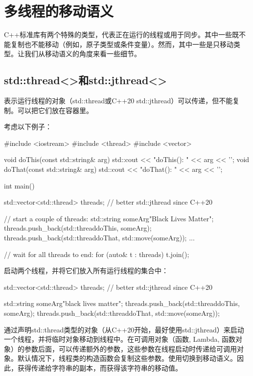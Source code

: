 \section{多线程的移动语义}
C++标准库有两个特殊的类型，代表正在运行的线程或用于同步。其中一些既不能复制也不能移动（例如，原子类型或条件变量）。然而，其中一些是只移动类型。让我们从移动语义的角度来看一些细节。

\subsection{std::thread<>和std::jthread<>}

表示运行线程的对象（std::thread或C++20 std::jthread）可以传递，但不能复制。可以把它们放在容器里。

考虑以下例子：

\begin{cppcode}
#include <iostream>
#include <thread>
#include <vector>

void doThis(const std::string& arg) {
	std::cout << "doThis(): " << arg << '\n';
}
void doThat(const std::string& arg) {
	std::cout << "doThat(): " << arg << '\n';
}

int main()
{
	std::vector<std::thread> threads; // better std::jthread since C++20

	// start a couple of threads:
	std::string someArg{"Black Lives Matter"};
	threads.push_back(std::thread{doThis, someArg});
	threads.push_back(std::thread{doThat, std::move(someArg)});
	...

	// wait for all threads to end:
	for (auto& t : threads) {
		t.join();
	}
}
\end{cppcode}

启动两个线程，并将它们放入所有运行线程的集合中：

\begin{cppcode}
std::vector<std::thread> threads; // better std::jthread since C++20

std::string someArg{"black lives matter"};
threads.push_back(std::thread{doThis, someArg});
threads.push_back(std::thread{doThat, std::move(someArg)});
\end{cppcode}

通过声明std::thread类型的对象（从C++20开始，最好使用std::jthread）来启动一个线程，并将临时对象移动到线程中。在可调用对象（函数, Lambda, 函数对象）的参数后面，可以传递额外的参数，这些参数在线程启动时传递给可调用对象。默认情况下，线程类的构造函数会复制这些参数。使用切换到移动语义。因此，获得传递给字符串的副本，而获得该字符串的移动值。

